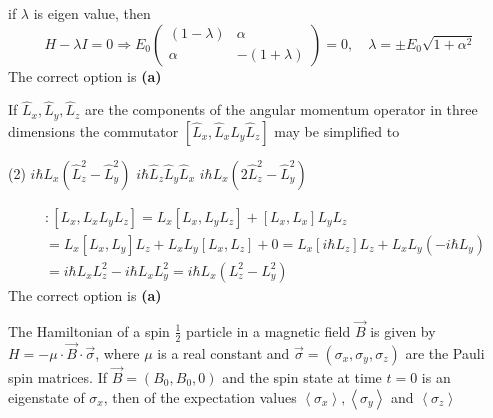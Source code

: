 \begin{enumerate}
\begin{answer}
	if $\lambda$ is eigen value, then
	$$
	H-\lambda I=0 \Rightarrow E_{0}\left(\begin{array}{cc}
	(1-\lambda) & \alpha \\
	\alpha & -(1+\lambda)
	\end{array}\right)=0, \quad \lambda=\pm E_{0} \sqrt{1+\alpha^{2}}
	$$
	The correct option is \textbf{(a)}
\end{answer}
\begin{minipage}{\textwidth}
	\item If $\hat{L}_{x}, \hat{L}_{y}, \hat{L}_{z}$ are the components of the angular momentum operator in three dimensions the commutator $\left[\hat{L}_{x}, \hat{L}_{x} \hat{L}_{y} \hat{L}_{z}\right]$ may be simplified to
\end{minipage}
\begin{tasks}(2)
	\task[\textbf{A.}] $i \hbar L_{x}\left(\hat{L}_{z}^{2}-\hat{L}_{y}^{2}\right)$
	\task[\textbf{B.}]$i \hbar \hat{L}_{z} \hat{L}_{y} \hat{L}_{x}$
	\task[\textbf{C.}] $i \hbar L_{x}\left(2 \hat{L}_{z}^{2}-\hat{L}_{y}^{2}\right)$
\end{tasks}
\begin{answer}
	\begin{align*}
		&:\left[L_{x}, L_{x} L_{y} L_{z}\right]=L_{x}\left[L_{x}, L_{y} L_{z}\right]+\left[L_{x}, L_{x}\right] L_{y} L_{z} \\
		&=L_{x}\left[L_{x}, L_{y}\right] L_{z}+L_{x} L_{y}\left[L_{x}, L_{z}\right]+0=L_{x}\left[i \hbar L_{z}\right] L_{z}+L_{x} L_{y}\left(-i \hbar L_{y}\right) \\
		&=i \hbar L_{x} L_{z}^{2}-i \hbar L_{x} L_{y}^{2}=i \hbar L_{x}\left(L_{z}^{2}-L_{y}^{2}\right)
	\end{align*}
	The correct option is \textbf{(a)}
\end{answer}
\begin{minipage}{\textwidth}
	\item The Hamiltonian of a spin $\frac{1}{2}$ particle in a magnetic field $\vec{B}$ is given by $H=-\mu \cdot \vec{B} \cdot \vec{\sigma}$, where $\mu$ is a real constant and $\vec{\sigma}=\left(\sigma_{x}, \sigma_{y}, \sigma_{z}\right)$ are the Pauli spin matrices. If $\vec{B}=\left(B_{0}, B_{0}, 0\right)$ and the spin state at time $t=0$ is an eigenstate of $\sigma_{x}$, then of the expectation values $\left\langle\sigma_{x}\right\rangle,\left\langle\sigma_{y}\right\rangle$ and $\left\langle\sigma_{z}\right\rangle$
\end{minipage}

\end{enumerate}
